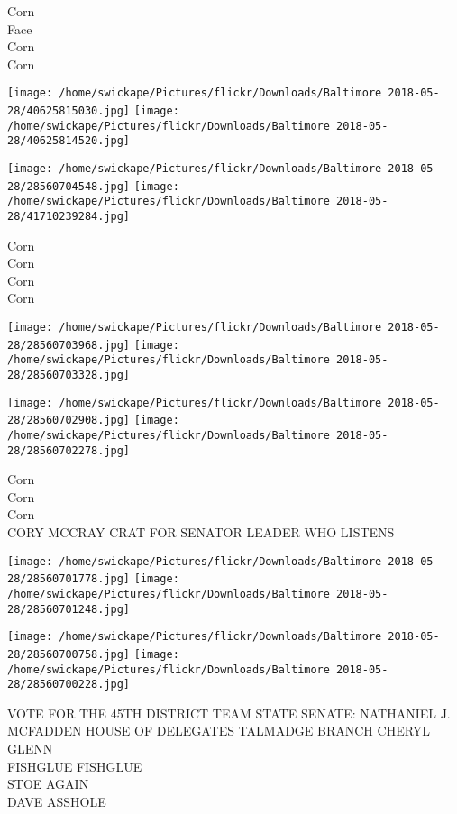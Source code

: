 \documentclass[10pt,letterpaper]{article}
\begin{document}
Corn\\
Face\\
Corn\\
Corn\\
\pagebreak

\texttt{[image: /home/swickape/Pictures/flickr/Downloads/Baltimore 2018-05-28/40625815030.jpg]}
\texttt{[image: /home/swickape/Pictures/flickr/Downloads/Baltimore 2018-05-28/40625814520.jpg]}

\texttt{[image: /home/swickape/Pictures/flickr/Downloads/Baltimore 2018-05-28/28560704548.jpg]}
\texttt{[image: /home/swickape/Pictures/flickr/Downloads/Baltimore 2018-05-28/41710239284.jpg]}

Corn\\
Corn\\
Corn\\
Corn\\
\pagebreak

\texttt{[image: /home/swickape/Pictures/flickr/Downloads/Baltimore 2018-05-28/28560703968.jpg]}
\texttt{[image: /home/swickape/Pictures/flickr/Downloads/Baltimore 2018-05-28/28560703328.jpg]}

\texttt{[image: /home/swickape/Pictures/flickr/Downloads/Baltimore 2018-05-28/28560702908.jpg]}
\texttt{[image: /home/swickape/Pictures/flickr/Downloads/Baltimore 2018-05-28/28560702278.jpg]}

Corn\\
Corn\\
Corn\\
CORY MCCRAY CRAT FOR SENATOR LEADER WHO LISTENS\\
\pagebreak

\texttt{[image: /home/swickape/Pictures/flickr/Downloads/Baltimore 2018-05-28/28560701778.jpg]}
\texttt{[image: /home/swickape/Pictures/flickr/Downloads/Baltimore 2018-05-28/28560701248.jpg]}

\texttt{[image: /home/swickape/Pictures/flickr/Downloads/Baltimore 2018-05-28/28560700758.jpg]}
\texttt{[image: /home/swickape/Pictures/flickr/Downloads/Baltimore 2018-05-28/28560700228.jpg]}

VOTE FOR THE 45TH DISTRICT TEAM STATE SENATE: NATHANIEL J. MCFADDEN HOUSE OF DELEGATES TALMADGE BRANCH CHERYL GLENN\\
FISHGLUE FISHGLUE\\
STOE AGAIN\\
DAVE ASSHOLE\\
\pagebreak
\end{document}
